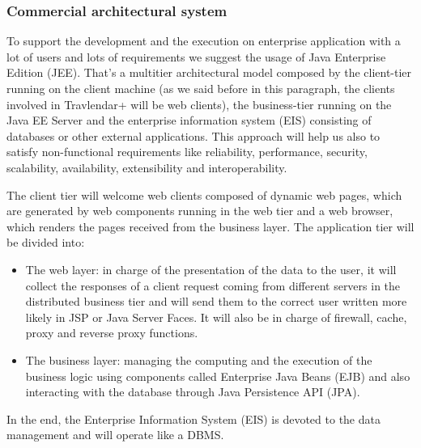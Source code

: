 \subsubsection{Commercial architectural system}
To support the development and the execution on enterprise application with a lot of users and lots of requirements we suggest the usage of Java Enterprise Edition (JEE).
That’s a multitier architectural model composed by the client-tier running on the client machine (as we said before in this paragraph, the clients involved in Travlendar+ will be web clients), the business-tier running on the Java EE Server and the enterprise information system (EIS) consisting of databases or other external applications.
This approach will help us also to satisfy non-functional requirements like reliability, performance, security, scalability, availability, extensibility and interoperability. 

The client tier will welcome web clients composed of dynamic web pages, which are generated by web components running in the web tier and a web browser, which renders the pages received
from the business layer.
The application tier will be divided into:
\begin{itemize}

\item	The web layer: in charge of the presentation of the data to the user, it will collect the responses of a client request coming from different servers in the distributed business tier and will send them to the correct user written more likely in JSP or Java Server Faces.
It will also be in charge of firewall, cache, proxy and reverse proxy functions.
\item	The business layer: managing the computing and the execution of the business logic using components called Enterprise Java Beans (EJB) and also interacting with the database through Java Persistence API (JPA).
\end{itemize}
In the end, the Enterprise Information System (EIS) is devoted to the data management and will operate like a DBMS.

